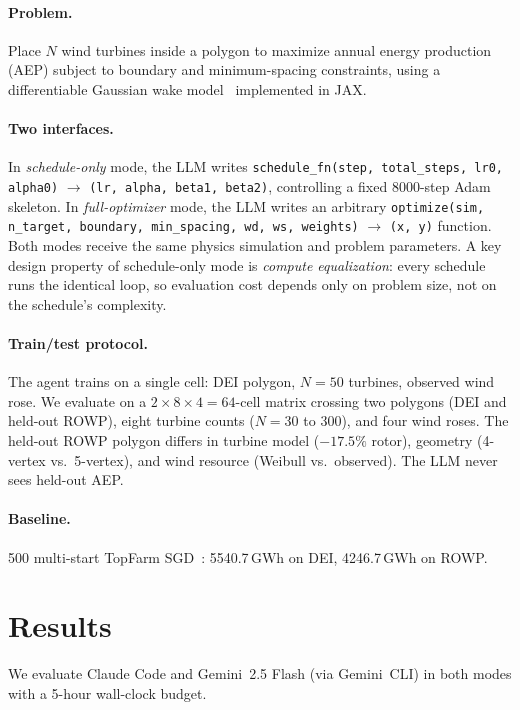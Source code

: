 \documentclass{article}
\begin{document}
\paragraph{Problem.}
Place $N$ wind turbines inside a polygon to maximize annual energy
production (AEP) subject to boundary and minimum-spacing constraints,
using a differentiable Gaussian wake
model~\cite{bastankhah2014new} implemented in JAX.

\paragraph{Two interfaces.}
In \emph{schedule-only} mode, the LLM writes
\texttt{schedule\_fn(step, total\_steps, lr0, alpha0)} $\to$
\texttt{(lr, alpha, beta1, beta2)}, controlling a fixed 8000-step Adam
skeleton. In \emph{full-optimizer} mode, the LLM writes an arbitrary
\texttt{optimize(sim, n\_target, boundary, min\_spacing, wd, ws,
weights)} $\to$ \texttt{(x, y)} function. Both modes receive the same
physics simulation and problem parameters. A key design property of
schedule-only mode is \emph{compute equalization}: every schedule runs
the identical loop, so evaluation cost depends only on problem size,
not on the schedule's complexity.

\paragraph{Train/test protocol.}
The agent trains on a single cell: DEI polygon, $N{=}50$ turbines,
observed wind rose. We evaluate on a $2 \times 8 \times 4 = 64$-cell
matrix crossing two polygons (DEI and held-out ROWP), eight turbine
counts ($N{=}30$ to $300$), and four wind roses. The held-out ROWP
polygon differs in turbine model ($-17.5\%$ rotor), geometry (4-vertex
vs.\ 5-vertex), and wind resource (Weibull vs.\ observed). The LLM
never sees held-out AEP.

\paragraph{Baseline.}
500 multi-start TopFarm SGD~\cite{pedersen2019topfarm}: 5540.7\,GWh on
DEI, 4246.7\,GWh on ROWP.

\section{Results}

We evaluate Claude Code and Gemini~2.5 Flash (via Gemini~CLI) in both
modes with a 5-hour wall-clock budget.
\end{document}
